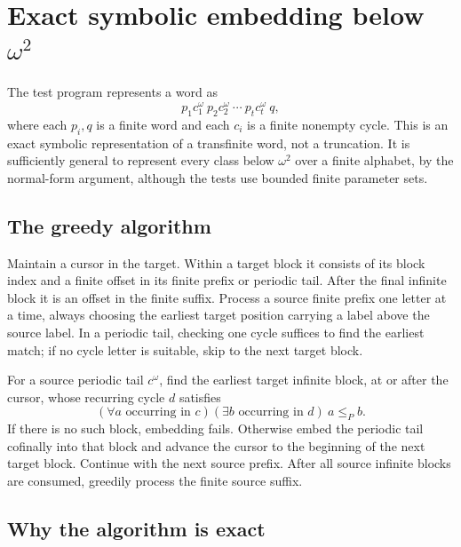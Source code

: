 \documentclass[11pt,letterpaper]{article}
\theoremstyle{definition}
\theoremstyle{remark}
\begin{document}
\section{Exact symbolic embedding below \texorpdfstring{$\omega^2$}{omega squared}}\label{app:decision}

The test program represents a word as
\begin{equation}\label{eq:symbolic}
  p_1 c_1^\omega\ p_2 c_2^\omega\ \cdots\ p_t c_t^\omega\ q,
\end{equation}
where each $p_i,q$ is a finite word and each $c_i$ is a finite nonempty
cycle. This is an exact symbolic representation of a transfinite word,
not a truncation. It is sufficiently general to represent every class
below $\omega^2$ over a finite alphabet, by the normal-form argument,
although the tests use bounded finite parameter sets.

\subsection{The greedy algorithm}

Maintain a cursor in the target. Within a target block it consists of
its block index and a finite offset in its finite prefix or periodic
tail. After the final infinite block it is an offset in the finite suffix.
Process a source finite prefix one letter at a time, always choosing
the earliest target position carrying a label above the source label.
In a periodic tail, checking one cycle suffices to find the earliest
match; if no cycle letter is suitable, skip to the next target block.

For a source periodic tail $c^\omega$, find the earliest target infinite
block, at or after the cursor, whose recurring cycle $d$ satisfies
\begin{equation}\label{eq:cyclecondition}
  (\forall a\text{ occurring in }c)
  (\exists b\text{ occurring in }d)\ a\le_P b.
\end{equation}
If there is no such block, embedding fails. Otherwise embed the periodic
tail cofinally into that block and advance the cursor to the beginning
of the next target block. Continue with the next source prefix. After
all source infinite blocks are consumed, greedily process the finite
source suffix.

\subsection{Why the algorithm is exact}
\end{document}
